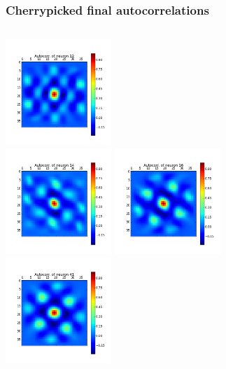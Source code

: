 \begin{frame}
\frametitle{Cherrypicked final autocorrelations}
\begin{columns}[t]
\centering
\includegraphics[width=4cm,height=4cm]{neurons/neuron_a_12.png}\\
\includegraphics[width=4cm,height=4cm]{neurons/neuron_a_14.png}
\centering
\includegraphics[width=4cm,height=4cm]{neurons/neuron_a_16.png}\\
\includegraphics[width=4cm,height=4cm]{neurons/neuron_a_41.png}
\end{columns}
\end{frame}

